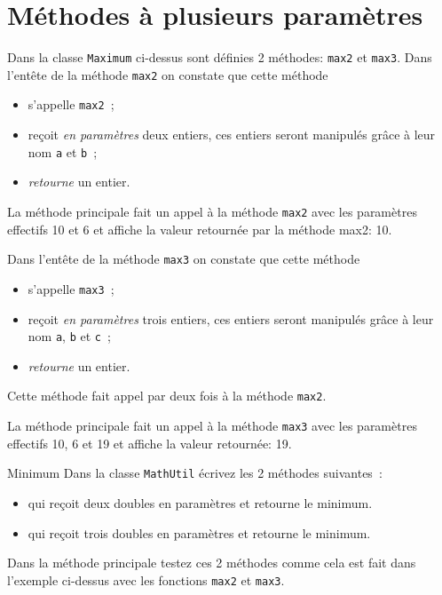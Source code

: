 \documentclass[a4paper,11pt]{article}
\begin{document}
\section{Méthodes à plusieurs paramètres}

	
	Dans la classe \texttt{Maximum} ci-dessus sont définies 2 méthodes: \texttt{max2} et \texttt{max3}.
	Dans l'entête de la méthode \texttt{max2} on constate que cette méthode 
	\begin{itemize}
		\item s'appelle \texttt{max2}~;
		\item reçoit \emph{en paramètres} deux entiers, ces entiers seront manipulés grâce à leur nom \texttt{a} et \texttt{b}~;
		\item \emph{retourne} un entier.
	\end{itemize}
		

	La méthode principale fait un appel à la méthode \texttt{max2} avec les paramètres effectifs 10 et 6 
	et affiche la valeur retournée par la méthode max2: 10.
	
	 Dans l'entête de la méthode \texttt{max3} on constate que cette méthode 
	\begin{itemize}
		\item s'appelle \texttt{max3}~;
		\item reçoit \emph{en paramètres} trois entiers, ces entiers seront manipulés grâce à leur nom \texttt{a}, \texttt{b} et \texttt{c}~;
		\item \emph{retourne} un entier.
	\end{itemize}

	Cette méthode fait appel par deux fois à la méthode \texttt{max2}.
	
	La méthode principale fait un appel à la méthode \texttt{max3} avec les paramètres effectifs 10, 6 et 19 
	et affiche la valeur retournée: 19.

 
 	\begin{Exercice}{Minimum}
		Dans la classe \texttt{MathUtil} écrivez les 2 méthodes suivantes~:		
		\begin{itemize}
			\item {} qui reçoit deux doubles en paramètres et retourne le minimum.
			\item {} qui reçoit trois doubles en paramètres et retourne le minimum.
		\end{itemize}
		
		Dans la méthode principale testez ces 2 méthodes comme cela est fait dans l'exemple ci-dessus avec les fonctions 
		\texttt{max2} et \texttt{max3}.
	\end{Exercice} 
		
\end{document}
